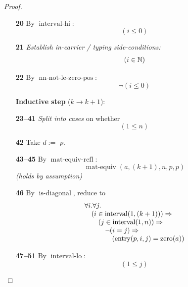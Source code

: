 \documentclass[11pt]{article}
\theoremstyle{plain}
\begin{document}
\begin{proof}
\begin{itemize}[leftmargin=2.8em, itemsep=4pt, parsep=1pt]
  \item[\textbf{20}] By $\operatorname{interval\text{-}hi}$:
\begin{equation*}
(i \leq 0)
\end{equation*}

  \item[\textbf{21}] \emph{Establish in-carrier / typing side-conditions:}
\begin{equation*}
\begin{array}{@{}l@{}}
(i \in \mathbb{N})
\end{array}
\end{equation*}

  \item[\textbf{22}] By $\operatorname{nn\text{-}not\text{-}le\text{-}zero\text{-}pos}$:
\begin{equation*}
\neg (i \leq 0)
\end{equation*}

  \item[]\textbf{Inductive step} ($k \to k + 1$):
  \item[\textbf{23--41}] \emph{Split into cases} on whether
\begin{equation*}
(1 \leq n)
\end{equation*}

  \item[\textbf{42}] Take $d :=$ $p$.
  \item[\textbf{43--45}] By $\operatorname{mat\text{-}equiv\text{-}refl}$:
\begin{equation*}
\operatorname{mat\text{-}equiv}(a, (k + 1), n, p, p)
\end{equation*}
  \emph{(holds by assumption)}
  \item[\textbf{46}] By $\operatorname{is\text{-}diagonal}$, reduce to
\begin{equation*}
\begin{array}{@{}l@{}} \forall i. \forall j. \\ \quad (i \in \operatorname{interval}(1, (k + 1))) \Rightarrow  \\ \quad \quad (j \in \operatorname{interval}(1, n)) \Rightarrow  \\ \quad \quad \quad \neg (i = j) \Rightarrow  \\ \quad \quad \quad \quad (\operatorname{entry}(p, i, j) = \operatorname{zero}(a)) \end{array}
\end{equation*}

  \item[\textbf{47--51}] By $\operatorname{interval\text{-}lo}$:
\begin{equation*}
(1 \leq j)
\end{equation*}


\end{itemize}
\end{proof}
\end{document}
